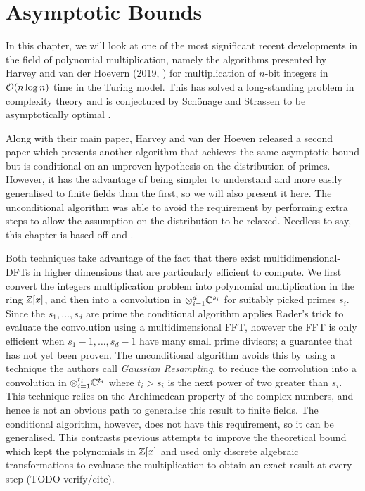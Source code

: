 \chapter{Asymptotic Bounds}\label{chp:asymptotic}

In this chapter, we will look at one of the most significant recent developments in the field of polynomial multiplication, namely the algorithms presented by Harvey and van der Hoevern (2019, \cite{nlogn}) for multiplication of $n$-bit integers in $\mathcal O(n \log n)$ time in the Turing model. This has solved a long-standing problem in complexity theory and is conjectured by Sch\"{o}nage and Strassen to be asymptotically optimal \cite{sch-str-optimality-int-mult}.

\medskip

Along with their main paper, Harvey and van der Hoeven released a second paper \cite{ffnlogn} which presents another algorithm that achieves the same asymptotic bound but is conditional on an unproven hypothesis on the distribution of primes. However, it has the advantage of being simpler to understand and more easily generalised to finite fields than the first, so we will also present it here. The unconditional algorithm was able to avoid the requirement by performing extra steps to allow the assumption on the distribution to be relaxed.
Needless to say, this chapter is based off \cite{nlogn} and \cite{ffnlogn}.

\medskip


Both techniques take advantage of the fact that there exist multidimensional-DFTs in higher dimensions that are particularly efficient to compute. We first convert the integers multiplication problem into polynomial multiplication in the ring ${\mathbb Z}[x]$, and then into a convolution in $\otimes_{i=1}^d {\mathbb C}^{s_i}$ for suitably picked primes $s_i$. Since the $s_1, \ldots, s_d$ are prime the conditional algorithm applies Rader's trick to evaluate the convolution using a multidimensional FFT, however the FFT is only efficient when $s_1 - 1, \ldots, s_d - 1$ have many small prime divisors; a guarantee that has not yet been proven. The unconditional algorithm avoids this by using a technique the authors call \emph{Gaussian Resampling}, to reduce the convolution into a convolution in $\otimes_{i=1}^{t_i} {\mathbb C}^{t_i}$ where $t_i > s_i$ is the next power of two greater than $s_i$.\\
This technique relies on the Archimedean property of the complex numbers, and hence is not an obvious path to generalise this result to finite fields. The conditional algorithm, however, does not have this requirement, so it can be generalised. This contrasts previous attempts to improve the theoretical bound which kept the polynomials in ${\mathbb Z}[x]$ and used only discrete algebraic transformations to evaluate the multiplication to obtain an exact result at every step (TODO verify/cite).

